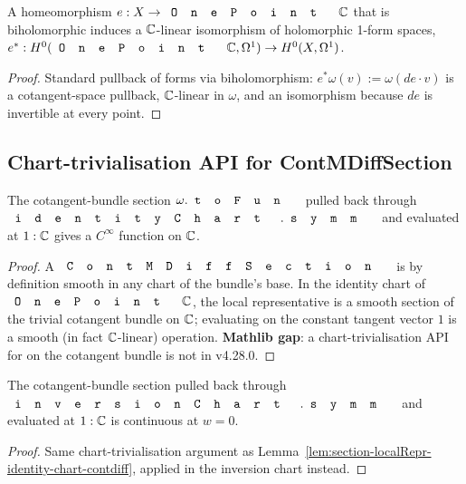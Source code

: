 \begin{lemma}
\label{lem:holomorphic-one-form-pullback-via-biholo}
A homeomorphism \(e:X\to\code{OnePoint}\,\C\) that is biholomorphic
induces a \(\mathbb{C}\)-linear isomorphism of holomorphic 1-form spaces,
\(e^{*}:H^{0}(\code{OnePoint}\,\C,\Omega^{1})\to H^{0}(X,\Omega^{1})\).
\leanok
\end{lemma}
\begin{proof}
\leanok
Standard pullback of forms via biholomorphism: \(e^*\omega(v):=\omega(de\cdot v)\)
is a cotangent-space pullback, \(\mathbb{C}\)-linear in \(\omega\), and an
isomorphism because \(de\) is invertible at every point.
\end{proof}

\subsection{Chart-trivialisation API for ContMDiffSection}
\label{sec:chart-trivialisation-API}

\begin{lemma}
\label{lem:section-localRepr-identity-chart-contdiff}
The cotangent-bundle section \(\omega.\code{toFun}\) pulled back through
\(\code{identityChart}.\code{symm}\) and evaluated at \(1:\mathbb{C}\) gives a
\(C^{\infty}\) function on \(\mathbb{C}\).
\leanok
\end{lemma}
\begin{proof}
\leanok
A \(\code{ContMDiffSection}\) is by definition smooth in any chart of
the bundle's base. In the identity chart of \(\code{OnePoint}\,\C\), the
local representative is a smooth section of the trivial cotangent
bundle on \(\mathbb{C}\); evaluating on the constant tangent vector \(1\) is
a smooth (in fact \(\mathbb{C}\)-linear) operation. \textbf{Mathlib gap}: a
chart-trivialisation API for  on the cotangent
bundle is not in v4.28.0.
\end{proof}

\begin{lemma}
\label{lem:section-localRepr-inversion-chart-continuous-at-zero}
The cotangent-bundle section pulled back through
\(\code{inversionChart}.\code{symm}\) and evaluated at \(1:\mathbb{C}\) is
continuous at \(w=0\).
\leanok
\end{lemma}
\begin{proof}
\leanok
Same chart-trivialisation argument as
Lemma~\ref{lem:section-localRepr-identity-chart-contdiff}, applied
in the inversion chart instead.
\end{proof}

